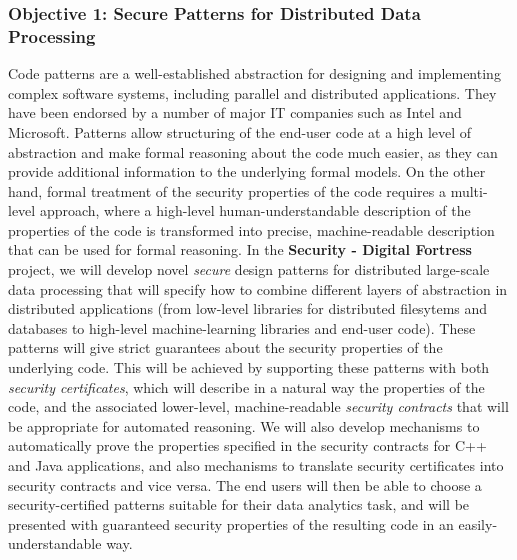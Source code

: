 \documentclass[a4paper,11pt]{article}
\newcommand{\project}[1]{\textbf{#1}\xspace}
\newcommand{\SECURITY}{\project{Security - Digital Fortress}}
\newcommand{\TheProject}{\SECURITY}
\begin{document}
\subsubsection*{Objective 1: Secure Patterns for Distributed Data Processing}
\vspace{-6pt}
Code patterns are a well-established abstraction for designing and implementing complex software systems, including parallel and distributed applications.  They have been endorsed by a number of major IT companies such as Intel and Microsoft. Patterns allow structuring of the end-user code at a high level of abstraction and make formal reasoning about the code much easier, as they can provide additional information to the underlying formal models. On the other hand, formal treatment of the security properties of the code requires a multi-level approach, where a high-level human-understandable description of the properties of the code is transformed into precise, machine-readable description that can be used for formal reasoning. In the \TheProject{} project, we will develop novel \emph{secure} design patterns for distributed large-scale data processing that will specify how to combine different layers of abstraction in distributed applications (from low-level libraries for distributed filesytems and databases to high-level machine-learning libraries and end-user code). These patterns will give strict guarantees about the security properties of the underlying code. This will be achieved by supporting these patterns with both \emph{security certificates}, which will describe in a natural way the properties of the code, and the associated lower-level, machine-readable \emph{security contracts} that will be appropriate for automated reasoning. We will also develop mechanisms to automatically prove the properties specified in the security contracts for C++ and Java applications, and also mechanisms to translate security certificates into security contracts and vice versa. The end users will then be able to choose a security-certified patterns suitable for their data analytics task, and will be presented with guaranteed security properties of the resulting code in an easily-understandable way. 
\end{document}
